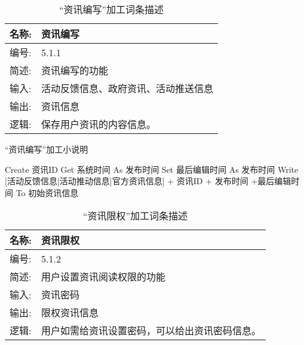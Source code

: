 \begin{table}[H]  
\caption{“资讯编写”加工词条描述}  
\begin{center}  
    \begin{tabular}{l p{11cm}} 
        \hline
        \quad 名称:  & 资讯编写 \\
        \hline
        \quad 编号:  & 5.1.1 \\
        \hline
        \quad 简述:  & 资讯编写的功能 \\
        \hline
        \quad 输入:  & 活动反馈信息、政府资讯、活动推送信息 \\
        \hline
        \quad 输出:  & 资讯信息 \\
        \hline
        \quad 逻辑:  & 保存用户资讯的内容信息。 \\
        \hline
    \end{tabular}
    \label{tab1}
\end{center}
\end{table}

\begin{algorithm}[H]
    \renewcommand{\thealgorithm}{}
    \caption{“资讯编写”加工小说明} 
    \label{alg3} 
    \begin{algorithmic}[1]
        \STATE Create 资讯ID
        \STATE Get 系统时间 As 发布时间
        \STATE Set 最后编辑时间 As 发布时间
        \STATE Write [活动反馈信息|活动推动信息|官方资讯信息] + 资讯ID + 发布时间 +最后编辑时间 To 初始资讯信息
    \end{algorithmic} 
\end{algorithm}

\begin{table}[H]  
\caption{“资讯限权”加工词条描述}  
\begin{center}  
    \begin{tabular}{l p{11cm}} 
        \hline
        \quad 名称:  &  资讯限权 \\
        \hline
        \quad 编号:  & 5.1.2 \\
        \hline
        \quad 简述:  & 用户设置资讯阅读权限的功能 \\
        \hline
        \quad 输入:  & 资讯密码 \\
        \hline
        \quad 输出:  & 限权资讯信息 \\
        \hline
        \quad 逻辑:  & 用户如需给资讯设置密码，可以给出资讯密码信息。 \\
        \hline
    \end{tabular}
    \label{tab1}
\end{center}
\end{table}

